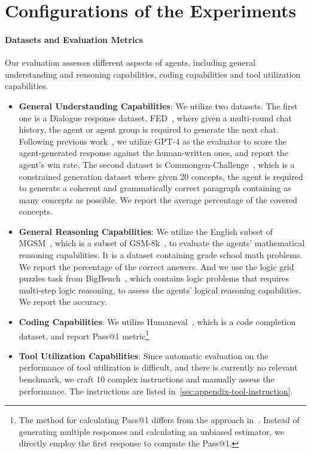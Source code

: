 \clearpage

\section{Configurations of the Experiments}
\label{sec:appendix-quant-config}

\paragraph{Datasets and Evaluation Metrics} Our evaluation assesses different aspects of agents, including general understanding and reasoning capabilities, coding capabilities and tool utilization capabilities.

\begin{itemize}[noitemsep,topsep=0pt,parsep=0pt,partopsep=0pt,leftmargin=2em]
    \item \textbf{General Understanding Capabilities}: We utilize two datasets. The first one is a Dialogue response dataset, FED~\citep{DBLP:conf/sigdial/MehriE20}, where given a multi-round chat history, the agent or agent group is required to generate the next chat. Following previous work~\citep{DBLP:journals/corr/abs-2303-17651}, we utilize GPT-4 as the evaluator to score the agent-generated response against the human-written ones, and report the agent's win rate. The second dataset is Commongen-Challenge~\citep{DBLP:journals/corr/abs-2303-17651}, which is a constrained generation dataset where given 20 concepts, the agent is required to generate a coherent and grammatically correct paragraph containing as many concepts as possible. We report the average percentage of the covered concepts.

    \item \textbf{General Reasoning Capabilities}: We utilize the English subset of MGSM~\citep{DBLP:conf/iclr/ShiSF0SVCTRZ0W23}, which is a subset of GSM-8k~\citep{DBLP:journals/corr/abs-2110-14168}, to evaluate the agents' mathematical reasoning capabilities. It is a dataset containing grade school math problems. We report the percentage of the correct answers. And we use the logic grid puzzles task from BigBench~\citep{DBLP:journals/corr/abs-2206-04615}, which contains logic problems that requires multi-step logic reasoning, to assess the agents' logical reasoning capabilities. We report the accuracy.

    \item \textbf{Coding Capabilities}: We utilize Humaneval~\citep{DBLP:journals/corr/abs-2107-03374}, which is a code completion dataset, and report Pass@1 metric\footnote{The method for calculating Pass@1 differs from the approach in~\citet{DBLP:journals/corr/abs-2107-03374}. Instead of generating multiple responses and calculating an unbiased estimator, we directly employ the first response to compute the Pass@1.}

    \item \textbf{Tool Utilization Capabilities}: Since automatic evaluation on the performance of tool utilization is difficult, and there is currently no relevant benchmark, we craft 10 complex instructions and manually assess the performance. The instructions are listed in~\cref{sec:appendix-tool-instruction}.
\end{itemize}

